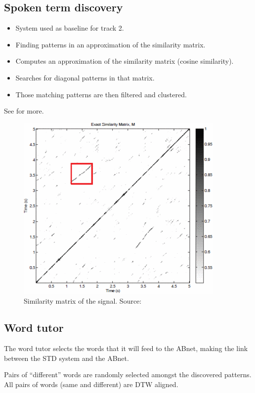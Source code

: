 \documentclass[final]{beamer}
\newcommand{\abnet}{{\sc ABnet}}
\begin{document}
\begin{frame}[t]
\begin{multicols}{3}

\subsection{Spoken term discovery}

\begin{itemize}
\item System used as baseline for track 2\cite{versteeghetal2015}.
\item Finding patterns in an approximation of the similarity matrix.
\item Computes an approximation of the similarity matrix (cosine similarity).
\item Searches for diagonal patterns in that matrix.
\item Those matching patterns are then filtered and clustered.
\end{itemize}

See \cite{jansenvandurme2011} for more.

\begin{figure}[ht!]
  \begin{center}
    \includegraphics[width=0.3\columnwidth]{similarity_matrix}
    \caption{\label{fig:system}Similarity matrix of the signal. Source: \cite{jansenvandurme2011}}
  \end{center}
\end{figure}

\subsection{Word tutor}

\begin{itemsize}
\item The word tutor selects the words that it will feed to the \abnet{}, making the link between the STD system and the \abnet{}.
\item Pairs of ``different'' words are randomly selected amongst the discovered patterns. All pairs of words (same and different) are DTW aligned.


\end{itemsize}
\end{multicols}
\end{frame}
\end{document}
